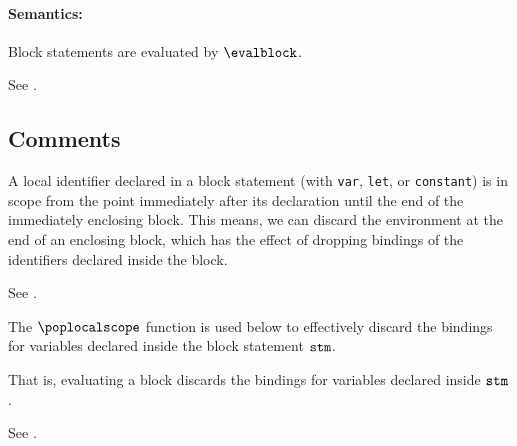 \paragraph{Semantics:} Block statements are evaluated by $\evalblock$.


See .

\subsection{Comments}
A local identifier declared in a block statement (with \texttt{var}, \texttt{let}, or \texttt{constant})
is in scope from the point immediately after its declaration until the end of the
immediately enclosing block. This means, we can discard the environment at the end of
an enclosing block, which has the effect of dropping bindings of the identifiers declared inside the block.



See .

The $\poplocalscope$ function is used below to effectively discard the bindings for variables declared inside the block statement $\texttt{stm}$.


That is, evaluating a block discards the bindings for variables declared inside $\texttt{stm}$.


See .

